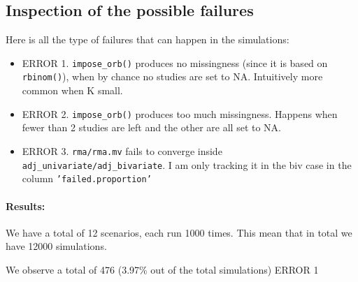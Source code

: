 \documentclass{article}\usepackage[]{graphicx}\usepackage[]{xcolor}
\begin{document}
\subsection{Inspection of the possible failures}



Here is all the type of failures that can happen in the simulations: 
\begin{itemize}
	\item ERROR 1. \texttt{impose\_orb()} produces no missingness (since it is based on \texttt{rbinom()}), when by chance no studies are set to NA. Intuitively more common when K small.
	\item ERROR 2. \texttt{impose\_orb()} produces too much missingness.  Happens when fewer than 2 studies are left and the other are all set to NA. 
	\item ERROR 3. \texttt{rma/rma.mv} fails to converge inside \texttt{adj\_univariate/adj\_bivariate}. I am only tracking it in the biv case in the column \texttt{'failed.proportion'}
\end{itemize}






\paragraph{Results:}
We have a total of 12 scenarios, each run 1000 times. This mean that in total we have 12000 simulations.

We observe a total of 476 (3.97\% out of the total simulations) ERROR 1
\end{document}
